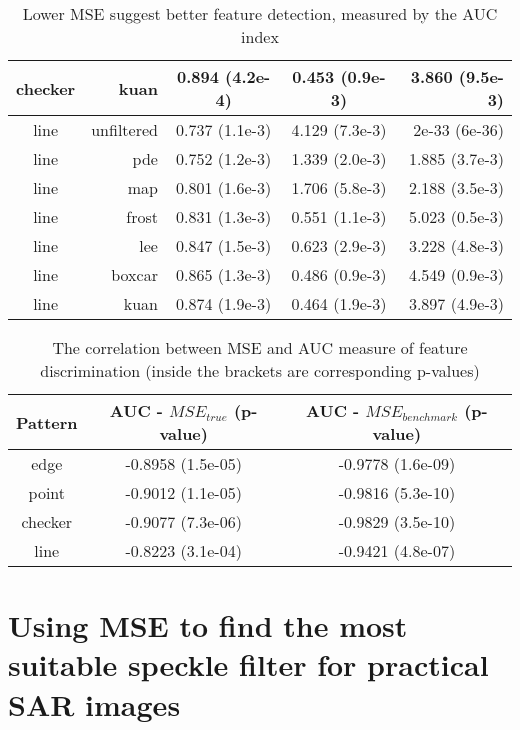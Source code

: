 \documentclass[journal]{IEEEtran}
\begin{document}
\begin{table}
\begin{tabular}{c|r|c|c|r}
 checker  &  kuan  &  0.894 (4.2e-4)  &  0.453 (0.9e-3)  &  3.860 (9.5e-3)\\
\hline
 line  &  unfiltered  &  0.737 (1.1e-3)  &  4.129 (7.3e-3)  &  2e-33 (6e-36)\\
 line  &  pde  &  0.752 (1.2e-3)  &  1.339 (2.0e-3)  &  1.885 (3.7e-3)\\
 line  &  map  &  0.801 (1.6e-3)  &  1.706 (5.8e-3)  &  2.188 (3.5e-3)\\
 line  &  frost  &  0.831 (1.3e-3)  &  0.551 (1.1e-3)  &  5.023 (0.5e-3)\\
 line  &  lee  &  0.847 (1.5e-3)  &  0.623 (2.9e-3)  &  3.228 (4.8e-3)\\
 line  &  boxcar  &  0.865 (1.3e-3)  &  0.486 (0.9e-3)  &  4.549 (0.9e-3)\\
 line  &  kuan  &  0.874 (1.9e-3)  &  0.464 (1.9e-3)  &  3.897 (4.9e-3)\\
\hline
\end{tabular}

\caption{Lower MSE suggest better feature detection, measured by the AUC index}
\label{tab:mse_auc_in_log_domain}
\end{table}

\begin{table}
\centering
\begin{tabular}{c|c|c}
Pattern  & AUC - $MSE_{true}$ (p-value) & AUC - $MSE_{benchmark}$ (p-value) \\
\hline
edge & -0.8958 (1.5e-05) &   -0.9778  (1.6e-09) \\
point &     -0.9012   (1.1e-05)   &    -0.9816        (5.3e-10) \\
checker &   -0.9077     (7.3e-06)  &  -0.9829       (3.5e-10) \\
line &      -0.8223     (3.1e-04)  &   -0.9421       (4.8e-07) \\
\hline
\end{tabular}

\caption{The correlation between MSE and AUC measure of feature discrimination (inside the brackets are corresponding p-values)}
\label{tab:mse_auc_corr_coeff}
\end{table}

\section{Using MSE to find the most suitable speckle filter for practical SAR images}
\label{sec:practical_conjecture}
\end{document}
